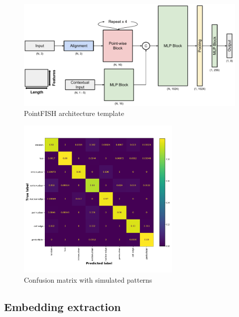 \begin{figure}[h]
    \centering
    \includegraphics[width=1\textwidth]{figures/chapter4/PointFISH_architecture}
    \caption{PointFISH architecture template}
    \label{fig:PointFISH_architecture}
\end{figure}

\begin{figure}[h]
    \centering
    \includegraphics[width=0.7\textwidth]{figures/chapter4/confusion_matrix}
    \caption{Confusion matrix with simulated patterns}
    \label{fig:confusion_matrix}
\end{figure}


\subsection{Embedding extraction} \label{subsec:learned_embedding}


